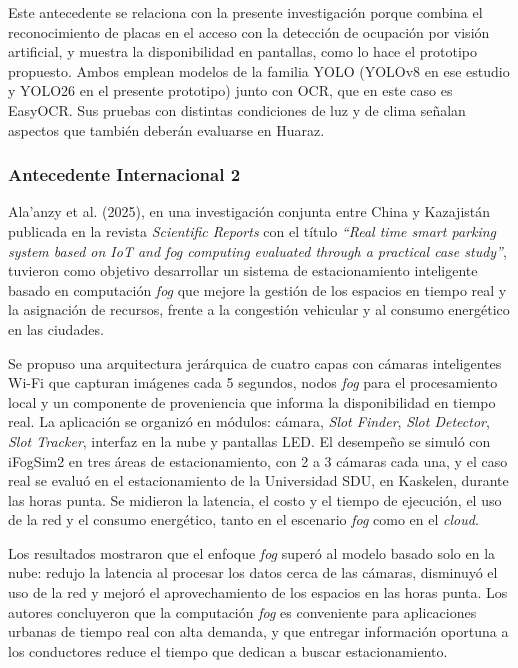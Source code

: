 \documentclass[12pt,a4paper]{article}
\begin{document}
Este antecedente se relaciona con la presente investigación porque combina el reconocimiento de placas en el acceso con la detección de ocupación por visión artificial, y muestra la disponibilidad en pantallas, como lo hace el prototipo propuesto. Ambos emplean modelos de la familia YOLO (YOLOv8 en ese estudio y YOLO26 en el presente prototipo) junto con OCR, que en este caso es EasyOCR. Sus pruebas con distintas condiciones de luz y de clima señalan aspectos que también deberán evaluarse en Huaraz.

\subsubsection{Antecedente Internacional 2}

Ala'anzy et al. (2025), en una investigación conjunta entre China y Kazajistán publicada en la revista \textit{Scientific Reports} con el título \textit{``Real time smart parking system based on IoT and fog computing evaluated through a practical case study''}, tuvieron como objetivo desarrollar un sistema de estacionamiento inteligente basado en computación \textit{fog} que mejore la gestión de los espacios en tiempo real y la asignación de recursos, frente a la congestión vehicular y al consumo energético en las ciudades.

Se propuso una arquitectura jerárquica de cuatro capas con cámaras inteligentes Wi-Fi que capturan imágenes cada 5 segundos, nodos \textit{fog} para el procesamiento local y un componente de proveniencia que informa la disponibilidad en tiempo real. La aplicación se organizó en módulos: cámara, \textit{Slot Finder}, \textit{Slot Detector}, \textit{Slot Tracker}, interfaz en la nube y pantallas LED. El desempeño se simuló con iFogSim2 en tres áreas de estacionamiento, con 2 a 3 cámaras cada una, y el caso real se evaluó en el estacionamiento de la Universidad SDU, en Kaskelen, durante las horas punta. Se midieron la latencia, el costo y el tiempo de ejecución, el uso de la red y el consumo energético, tanto en el escenario \textit{fog} como en el \textit{cloud}.

Los resultados mostraron que el enfoque \textit{fog} superó al modelo basado solo en la nube: redujo la latencia al procesar los datos cerca de las cámaras, disminuyó el uso de la red y mejoró el aprovechamiento de los espacios en las horas punta. Los autores concluyeron que la computación \textit{fog} es conveniente para aplicaciones urbanas de tiempo real con alta demanda, y que entregar información oportuna a los conductores reduce el tiempo que dedican a buscar estacionamiento.
\end{document}

